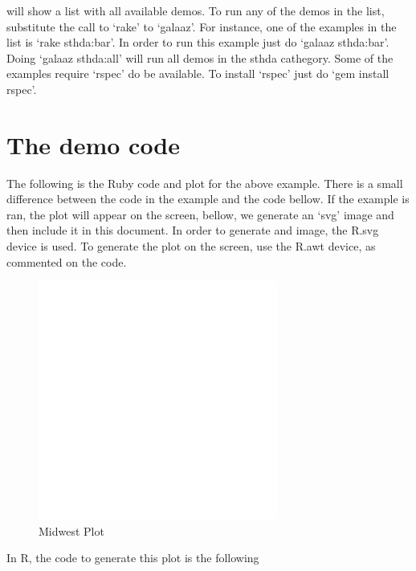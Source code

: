 \documentclass[11pt,]{article}
\begin{document}
will show a list with all available demos. To run any of the demos in
the list, substitute the call to `rake' to `galaaz'. For instance, one
of the examples in the list is `rake sthda:bar'. In order to run this
example just do `galaaz sthda:bar'. Doing `galaaz sthda:all' will run
all demos in the sthda cathegory. Some of the examples require `rspec'
do be available. To install `rspec' just do `gem install rspec'.

\hypertarget{the-demo-code}{%
\section{The demo code}\label{the-demo-code}}

The following is the Ruby code and plot for the above example. There is
a small difference between the code in the example and the code bellow.
If the example is ran, the plot will appear on the screen, bellow, we
generate an `svg' image and then include it in this document. In order
to generate and image, the R.svg device is used. To generate the plot on
the screen, use the R.awt device, as commented on the code.

\begin{figure}
\centering
\includegraphics[width=0.7\textwidth,height=\textheight]{midwest.png}
\caption{Midwest Plot}
\end{figure}

In R, the code to generate this plot is the following
\end{document}
